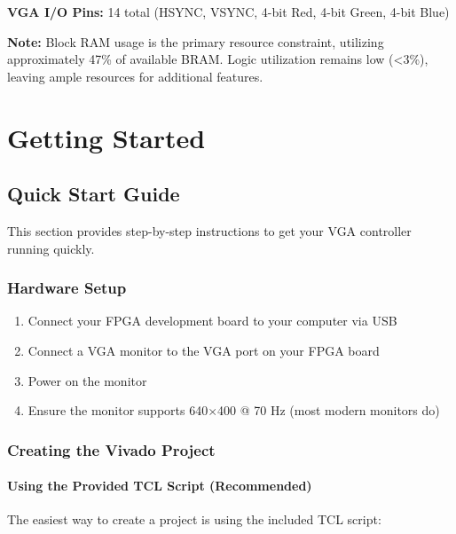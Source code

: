 \documentclass[11pt,letterpaper]{report}
\begin{document}
\textbf{VGA I/O Pins:} 14 total (HSYNC, VSYNC, 4-bit Red, 4-bit Green, 4-bit Blue)

\textbf{Note:} Block RAM usage is the primary resource constraint, utilizing approximately 47\% of available BRAM. Logic utilization remains low (<3\%), leaving ample resources for additional features.

\chapter{Getting Started}

\section{Quick Start Guide}

This section provides step-by-step instructions to get your VGA controller running quickly.

\subsection{Hardware Setup}

\begin{enumerate}
    \item Connect your FPGA development board to your computer via USB
    \item Connect a VGA monitor to the VGA port on your FPGA board
    \item Power on the monitor
    \item Ensure the monitor supports 640$\times$400 @ 70 Hz (most modern monitors do)
\end{enumerate}

\subsection{Creating the Vivado Project}

\subsubsection{Using the Provided TCL Script (Recommended)}

The easiest way to create a project is using the included TCL script:
\end{document}
